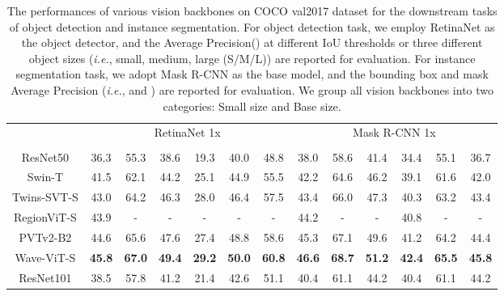\documentclass[runningheads]{llncs}
\begin{document}
\begin{table*}[!tb]\scriptsize
\vspace{-0.1in}
\centering
\caption{The performances of various vision backbones on COCO val2017 dataset for the downstream tasks of object detection and instance segmentation. For object detection task, we employ RetinaNet as the object detector, and the Average Precision() at different IoU thresholds or three different object sizes (\emph{i.e.}, small, medium, large (S/M/L)) are reported for evaluation. For instance segmentation task, we adopt Mask R-CNN as the base model, and the bounding box and mask Average Precision (\emph{i.e.},  and ) are reported for evaluation. We group all vision backbones into two categories: Small size and Base size.}
\vspace{-0.1in}
\setlength{\tabcolsep}{0.5pt}
\begin{tabular}{c|cccccc|cccccc}
\Xhline{2\arrayrulewidth}
\multirow{2}{*}{Backbone} & \multicolumn{6}{c|}{RetinaNet 1x \cite{lin2017focal}}       & \multicolumn{6}{c}{Mask R-CNN 1x \cite{he2017mask}}           \\ \cline{2-13}
   &  &  &  &  &  &  &  &  &  &   &  &  \\ \hline
ResNet50 \cite{he2016deep}                   & 36.3 & 55.3 & 38.6 & 19.3 & 40.0 & 48.8 & 38.0 & 58.6  & 41.4  & 34.4 & 55.1  & 36.7  \\
Swin-T   \cite{liu2021swin}                  & 41.5 & 62.1 & 44.2 & 25.1 & 44.9 & 55.5 & 42.2 & 64.6  & 46.2  & 39.1 & 61.6  & 42.0  \\
Twins-SVT-S \cite{chu2021twins}              & 43.0 & 64.2 & 46.3 & 28.0 & 46.4 & 57.5 & 43.4 & 66.0  & 47.3  & 40.3 & 63.2  & 43.4  \\
RegionViT-S \cite{chen2021regionvit}         & 43.9 & -    & -    & -    & -    & -    & 44.2 & -     & -     & 40.8 & -     & -     \\
PVTv2-B2  \cite{wang2021pvtv2}               & 44.6 & 65.6 & 47.6 & 27.4 & 48.8 & 58.6 & 45.3 & 67.1  & 49.6  & 41.2 & 64.2  & 44.4  \\
Wave-ViT-S                                   & \textbf{45.8} & \textbf{67.0} & \textbf{49.4} & \textbf{29.2} & \textbf{50.0} & \textbf{60.8} & \textbf{46.6} & \textbf{68.7}  & \textbf{51.2}  & \textbf{42.4} & \textbf{65.5}  & \textbf{45.8}  \\ \hline \hline
ResNet101 \cite{he2016deep}                  & 38.5 & 57.8 & 41.2 & 21.4 & 42.6 & 51.1 & 40.4 & 61.1  & 44.2  & 40.4 & 61.1  & 44.2  \\

\end{tabular}
\end{table*}
\end{document}

